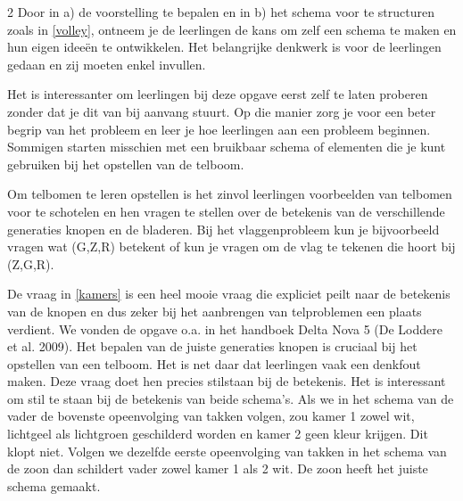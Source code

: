 \begin{multicols}{2} %
Door in a) de voorstelling te bepalen en in b) het schema voor te structuren zoals in \autoref{volley}, ontneem je de leerlingen de kans om zelf een schema te maken en hun eigen ideeën te ontwikkelen. Het belangrijke denkwerk is voor de leerlingen gedaan en zij moeten enkel invullen. 

Het is interessanter om leerlingen bij deze opgave eerst zelf te laten proberen zonder dat je dit van bij aanvang stuurt. Op die manier zorg je voor een beter begrip van het probleem en leer je hoe leerlingen aan een probleem beginnen. Sommigen starten misschien met een bruikbaar schema of elementen die je kunt gebruiken bij het opstellen van de telboom. 

Om telbomen te leren opstellen is het zinvol leerlingen voorbeelden van telbomen voor te schotelen en hen vragen te stellen over de betekenis van de verschillende generaties knopen en de bladeren. Bij het vlaggenprobleem kun je bijvoorbeeld vragen wat (G,Z,R) betekent of kun je vragen om de vlag te tekenen die hoort bij (Z,G,R). 

De vraag in \autoref{kamers} is een heel mooie vraag die expliciet peilt naar de betekenis van de knopen en dus zeker bij het aanbrengen van telproblemen een plaats verdient. We vonden de opgave o.a. in het handboek Delta Nova 5 (De Loddere et al. 2009). Het bepalen van de juiste generaties knopen is cruciaal bij het opstellen van een telboom. Het is net daar dat leerlingen vaak een denkfout maken. Deze vraag doet hen precies stilstaan bij de betekenis. Het is interessant om stil te staan bij de betekenis van beide schema's. Als we in het schema van de vader de bovenste opeenvolging van takken volgen, zou kamer 1 zowel wit, lichtgeel als lichtgroen geschilderd worden en kamer 2 geen kleur krijgen. Dit klopt niet. Volgen we dezelfde eerste opeenvolging van takken in het schema van de zoon dan schildert vader zowel kamer 1 als 2 wit. De zoon heeft het juiste schema gemaakt.

\end{multicols}

